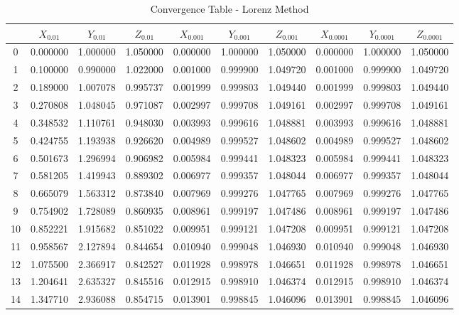 \documentclass[12pt, a4paper]{article}
\begin{document}
	\begin{table}[H]
		\centering
		\footnotesize %
		\begin{tabular}{|c|c|c|c|c|c|c|c|c|c|}
			\toprule
			   & $X_{0.01}$ & $Y_{0.01}$ & $Z_{0.01}$ & $X_{0.001}$ & $Y_{0.001}$ & $Z_{0.001}$ & $X_{0.0001}$ & $Y_{0.0001}$ & $Z_{0.0001}$ \\
			\midrule
			0  & 0.000000   & 1.000000   & 1.050000   & 0.000000    & 1.000000    & 1.050000    & 0.000000     & 1.000000     & 1.050000     \\
			1  & 0.100000   & 0.990000   & 1.022000   & 0.001000    & 0.999900    & 1.049720    & 0.001000     & 0.999900     & 1.049720     \\
			2  & 0.189000   & 1.007078   & 0.995737   & 0.001999    & 0.999803    & 1.049440    & 0.001999     & 0.999803     & 1.049440     \\
			3  & 0.270808   & 1.048045   & 0.971087   & 0.002997    & 0.999708    & 1.049161    & 0.002997     & 0.999708     & 1.049161     \\
			4  & 0.348532   & 1.110761   & 0.948030   & 0.003993    & 0.999616    & 1.048881    & 0.003993     & 0.999616     & 1.048881     \\
			5  & 0.424755   & 1.193938   & 0.926620   & 0.004989    & 0.999527    & 1.048602    & 0.004989     & 0.999527     & 1.048602     \\
			6  & 0.501673   & 1.296994   & 0.906982   & 0.005984    & 0.999441    & 1.048323    & 0.005984     & 0.999441     & 1.048323     \\
			7  & 0.581205   & 1.419943   & 0.889302   & 0.006977    & 0.999357    & 1.048044    & 0.006977     & 0.999357     & 1.048044     \\
			8  & 0.665079   & 1.563312   & 0.873840   & 0.007969    & 0.999276    & 1.047765    & 0.007969     & 0.999276     & 1.047765     \\
			9  & 0.754902   & 1.728089   & 0.860935   & 0.008961    & 0.999197    & 1.047486    & 0.008961     & 0.999197     & 1.047486     \\
			10 & 0.852221   & 1.915682   & 0.851022   & 0.009951    & 0.999121    & 1.047208    & 0.009951     & 0.999121     & 1.047208     \\
			11 & 0.958567   & 2.127894   & 0.844654   & 0.010940    & 0.999048    & 1.046930    & 0.010940     & 0.999048     & 1.046930     \\
			12 & 1.075500   & 2.366917   & 0.842527   & 0.011928    & 0.998978    & 1.046651    & 0.011928     & 0.998978     & 1.046651     \\
			13 & 1.204641   & 2.635327   & 0.845516   & 0.012915    & 0.998910    & 1.046374    & 0.012915     & 0.998910     & 1.046374     \\
			14 & 1.347710   & 2.936088   & 0.854715   & 0.013901    & 0.998845    & 1.046096    & 0.013901     & 0.998845     & 1.046096     \\
			\bottomrule
		\end{tabular}
		\caption{Convergence Table - Lorenz Method}
	\end{table}
	    
\end{document}
